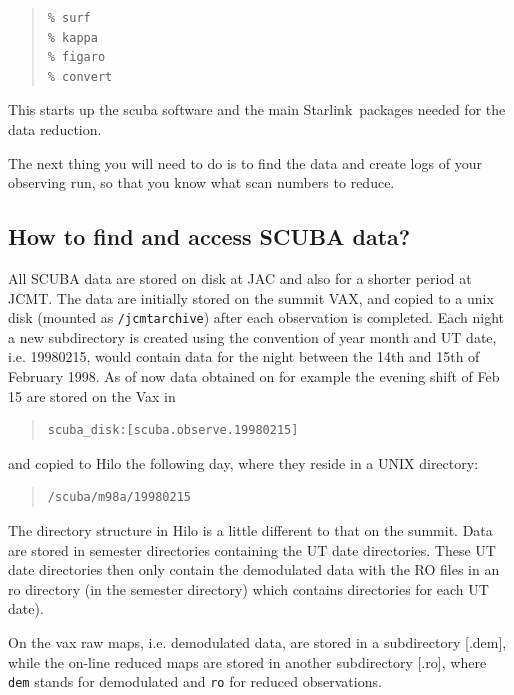 \documentclass[twoside,11pt]{article}
\newenvironment{myquote}{\begin{quote}\begin{small}}{\end{small}\end{quote}}
\newcommand{\starlink}{\htmladdnormallink{Starlink}{http://star-www.rl.ac.uk/}}
\newcommand{\htmladdnormallink}[2]{#1}
\newcommand{\xlabel}[1]{}
\renewcommand{\_}{\texttt{\symbol{95}}}
\begin{document}
\begin{myquote}
\begin{verbatim}
% surf
% kappa
% figaro
% convert
\end{verbatim}
\end{myquote}

This starts up the scuba software and the main \starlink\ packages
needed for the data reduction.

The next thing you will need to do is to find the data and create
logs of your observing run, so that you know what scan numbers to reduce.


\subsection{\xlabel{how_to_find}How to find and access SCUBA data?}

All SCUBA data are stored on disk at
\htmladdnormallink{JAC}{http://www.jach.hawaii.edu/} and also for a
shorter period at JCMT. The data are initially stored on the summit
VAX, and copied to a unix disk (mounted as \texttt{/jcmtarchive}) after
each observation is completed.  Each night a new subdirectory is
created using the convention of year month and UT date, i.e. 19980215,
would contain data for the night between the 14th and 15th of February
1998. As of now data obtained on  for example the evening shift of Feb
15 are stored on the Vax in
\begin{myquote}
\begin{verbatim}
scuba_disk:[scuba.observe.19980215]
\end{verbatim}  
\end{myquote}

and copied to Hilo the following day, where they reside in a UNIX
directory:
\begin{myquote}
\begin{verbatim}
/scuba/m98a/19980215
\end{verbatim}
\end{myquote}
The directory structure in Hilo is a little different to that on the summit.
Data are stored in semester directories containing the UT date directories.
These UT date directories then only contain the demodulated data with the
RO files in an ro directory (in the semester directory) which contains
directories for each UT date).

On the vax raw maps, i.e. demodulated data, are stored in a subdirectory [.dem],
while the on-line reduced maps are stored in another subdirectory
[.ro], where \texttt{dem} stands for demodulated and \texttt{ro} for
reduced observations. 
\end{document}
